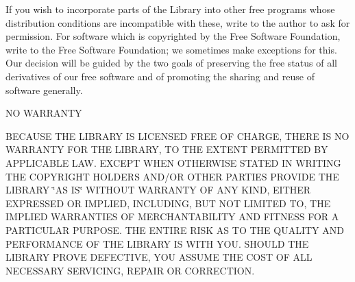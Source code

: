 \begin{DoxyEnumerate}
\item If you wish to incorporate parts of the Library into other free programs whose distribution conditions are incompatible with these, write to the author to ask for permission. For software which is copyrighted by the Free Software Foundation, write to the Free Software Foundation; we sometimes make exceptions for this. Our decision will be guided by the two goals of preserving the free status of all derivatives of our free software and of promoting the sharing and reuse of software generally. \begin{DoxyVerb}                        NO WARRANTY
\end{DoxyVerb}

\item B\+E\+C\+A\+U\+SE T\+HE L\+I\+B\+R\+A\+RY IS L\+I\+C\+E\+N\+S\+ED F\+R\+EE OF C\+H\+A\+R\+GE, T\+H\+E\+RE IS NO W\+A\+R\+R\+A\+N\+TY F\+OR T\+HE L\+I\+B\+R\+A\+RY, TO T\+HE E\+X\+T\+E\+NT P\+E\+R\+M\+I\+T\+T\+ED BY A\+P\+P\+L\+I\+C\+A\+B\+LE L\+AW. E\+X\+C\+E\+PT W\+H\+EN O\+T\+H\+E\+R\+W\+I\+SE S\+T\+A\+T\+ED IN W\+R\+I\+T\+I\+NG T\+HE C\+O\+P\+Y\+R\+I\+G\+HT H\+O\+L\+D\+E\+RS A\+N\+D/\+OR O\+T\+H\+ER P\+A\+R\+T\+I\+ES P\+R\+O\+V\+I\+DE T\+HE L\+I\+B\+R\+A\+RY \char`\"{}\+A\+S I\+S\char`\"{} W\+I\+T\+H\+O\+UT W\+A\+R\+R\+A\+N\+TY OF A\+NY K\+I\+ND, E\+I\+T\+H\+ER E\+X\+P\+R\+E\+S\+S\+ED OR I\+M\+P\+L\+I\+ED, I\+N\+C\+L\+U\+D\+I\+NG, B\+UT N\+OT L\+I\+M\+I\+T\+ED TO, T\+HE I\+M\+P\+L\+I\+ED W\+A\+R\+R\+A\+N\+T\+I\+ES OF M\+E\+R\+C\+H\+A\+N\+T\+A\+B\+I\+L\+I\+TY A\+ND F\+I\+T\+N\+E\+SS F\+OR A P\+A\+R\+T\+I\+C\+U\+L\+AR P\+U\+R\+P\+O\+SE. T\+HE E\+N\+T\+I\+RE R\+I\+SK AS TO T\+HE Q\+U\+A\+L\+I\+TY A\+ND P\+E\+R\+F\+O\+R\+M\+A\+N\+CE OF T\+HE L\+I\+B\+R\+A\+RY IS W\+I\+TH Y\+OU. S\+H\+O\+U\+LD T\+HE L\+I\+B\+R\+A\+RY P\+R\+O\+VE D\+E\+F\+E\+C\+T\+I\+VE, Y\+OU A\+S\+S\+U\+ME T\+HE C\+O\+ST OF A\+LL N\+E\+C\+E\+S\+S\+A\+RY S\+E\+R\+V\+I\+C\+I\+NG, R\+E\+P\+A\+IR OR C\+O\+R\+R\+E\+C\+T\+I\+ON.

\end{DoxyEnumerate}

